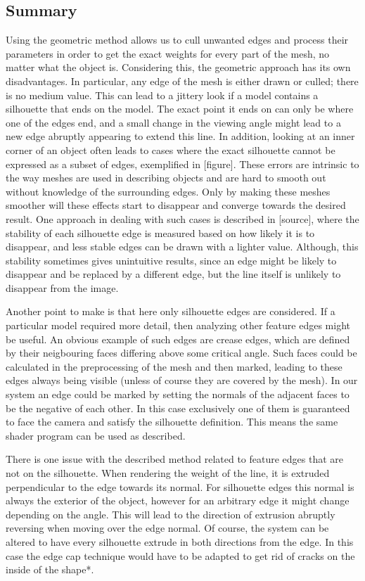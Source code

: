 \documentclass[a4paper, 12pt]{article}
\begin{document}
\subsection{Summary}
Using the geometric method allows us to cull unwanted edges and process their parameters in order to get the exact weights for every part of the mesh, no matter what the object is. Considering this, the geometric approach has its own disadvantages. In particular, any edge of the mesh is either drawn or culled; there is no medium value. This can lead to a jittery look if a model contains a silhouette that ends on the model. The exact point it ends on can only be where one of the edges end, and a small change in the viewing angle might lead to a new edge abruptly appearing to extend this line. In addition, looking at an inner corner of an object often leads to cases where the exact silhouette cannot be expressed as a subset of edges, exemplified in [figure]. These errors are intrinsic to the way meshes are used in describing objects and are hard to smooth out without knowledge of the surrounding edges. Only by making these meshes smoother will these effects start to disappear and converge towards the desired result. One approach in dealing with such cases is described in [source], where the stability of each silhouette edge is measured based on how likely it is to disappear, and less stable edges can be drawn with a lighter value. Although, this stability sometimes gives unintuitive results, since an edge might be likely to disappear and be replaced by a different edge, but the line itself is unlikely to disappear from the image.

Another point to make is that here only silhouette edges are considered. If a particular model required more detail, then analyzing other feature edges might be useful. An obvious example of such edges are crease edges, which are defined by their neigbouring faces differing above some critical angle. Such faces could be calculated in the preprocessing of the mesh and then marked, leading to these edges always being visible (unless of course they are covered by the mesh). In our system an edge could be marked by setting the normals of the adjacent faces to be the negative of each other. In this case exclusively one of them is guaranteed to face the camera and satisfy the silhouette definition. This means the same shader program can be used as described.

There is one issue with the described method related to feature edges that are not on the silhouette. When rendering the weight of the line, it is extruded perpendicular to the edge towards its normal. For silhouette edges this normal is always the exterior of the object, however for an arbitrary edge it might change depending on the angle. This will lead to the direction of extrusion abruptly reversing when moving over the edge normal. Of course, the system can be altered to have every silhouette extrude in both directions from the edge. In this case the edge cap technique would have to be adapted to get rid of cracks on the inside of the shape*.
\end{document}
